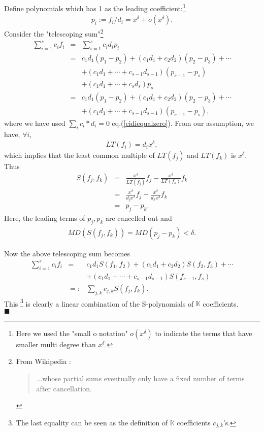 \documentclass[11pt]{book}
\begin{document}
Define polynomials which has 1 as the leading coefficient:\footnote{Here we used the "small o notation" $o(x^\delta)$ to indicate the terms that have smaller multi degree than $x^\delta$.}
\begin{eqnarray}
p_i := f_i/d_i = x^\delta + o(x^\delta).
\end{eqnarray}
Consider the "telescoping sum"\footnote{
From Wikipedia : \begin{quote}
...whose partial sums eventually only have a fixed number of terms after cancellation.
\end{quote}
}
\begin{eqnarray}
\sum_{i=1}^s c_i f_i &=& \sum_{i=1}^s c_i d_i p_i \\
\nonumber
&=& c_1 d_1 (p_1 -p_2) + (c_1d_1 + c_2 d_2)(p_2 -p_3) + \cdots \\
\nonumber
&&+ (c_1d_1 + \cdots + c_{s-1} d_{s-1})(p_{s-1} - p_s) \\
\nonumber
&&+ (c_1d_1 + \cdots + c_s d_s) p_s \\
\nonumber
&=& c_1 d_1 (p_1 -p_2) + (c_1d_1 + c_2 d_2)(p_2 -p_3) + \cdots \\
&&+ (c_1d_1 + \cdots + c_{s-1} d_{s-1})(p_{s-1} - p_s),
\end{eqnarray}
where we have used $\sum_i c_i * d_i = 0$ eq.(\ref{cidiequalzero}).
From our assumption, we have, $\forall i$,
\begin{eqnarray}
LT(f_i) = d_i x^\delta,
\end{eqnarray}
which implies that the least common multiple of $LT(f_j)$ and $LT(f_k)$ is $x^\delta$.
Thus
\begin{eqnarray}
S(f_j, f_k) &=& \frac{x^\delta}{LT(f_j)}f_j- \frac{x^\delta}{LT(f_k)}f_k \\
&=& \frac{x^\delta}{d_j x^\delta}f_j- \frac{x^\delta}{d_k x^\delta}f_k \\
&=& p_j - p_k.
\end{eqnarray}
Here, the leading terms of $p_j, p_k$ are cancelled out and
\begin{eqnarray}
MD\left( S(f_j, f_k) \right) = MD(p_j -p_k) < \delta.
\end{eqnarray}

Now the above telescoping sum becomes
\begin{eqnarray}
\nonumber
\sum_{i=1}^s c_i f_i &=& c_1 d_1 S(f_1, f_2) + (c_1d_1 + c_2 d_2)S(f_2, f_3) + \cdots\\
&& + (c_1d_1 + \cdots + c_{s-1}d_{s-1}) S(f_{s-1}, f_s) \\
&=:& \sum_{j,k} c_{j,k} S(f_j, f_k).
\end{eqnarray}
This \footnote{The last equality can be seen as the definition of $\mathbb{K}$ coefficients $c_{j,k}$'s.} is clearly a linear combination of the S-polynomials of $\mathbb{K}$ coefficients.\\
$\blacksquare$
\end{document}
